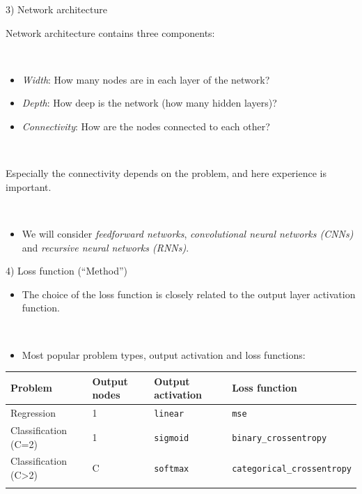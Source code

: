 \documentclass[
  10pt,
  ignorenonframetext,
]{beamer}
\providecommand{\tightlist}{%
  \setlength{\itemsep}{0pt}\setlength{\parskip}{0pt}}
\begin{document}
\begin{frame}
\begin{block}{3) Network architecture}
\protect\hypertarget{network-architecture}{}
\(~\)

Network architecture contains three components:

\(~\)

\begin{itemize}
\item
  \emph{Width}: How many nodes are in each layer of the network?
\item
  \emph{Depth}: How deep is the network (how many hidden layers)?
\item
  \emph{Connectivity}: How are the nodes connected to each other?
\end{itemize}

\(~\)

Especially the connectivity depends on the problem, and here experience
is important.

\(~\)

\begin{itemize}
\tightlist
\item
  We will consider \emph{feedforward networks}, \emph{convolutional
  neural networks (CNNs)} and \emph{recursive neural networks (RNNs)}.
\end{itemize}
\end{block}
\end{frame}

\begin{frame}[fragile]
\begin{block}{4) Loss function (``Method'')}
\protect\hypertarget{loss-function-method}{}
\(~\)

\begin{itemize}
\tightlist
\item
  The choice of the loss function is closely related to the output layer
  activation function.
\end{itemize}

\(~\)

\begin{itemize}
\tightlist
\item
  Most popular problem types, output activation and loss functions:
\end{itemize}

\scriptsize

\begin{longtable}[]{@{}llll@{}}
\toprule\noalign{}
Problem & Output nodes & Output activation & Loss function \\
\midrule\noalign{}
\endhead
Regression & 1 & \texttt{linear} & \texttt{mse} \\
Classification (C=2) & 1 & \texttt{sigmoid} &
\texttt{binary\_crossentropy} \\
Classification (C\textgreater2) & C & \texttt{softmax} &
\texttt{categorical\_crossentropy} \\
\bottomrule\noalign{}
\end{longtable}
\end{block}
\end{frame}
\end{document}
